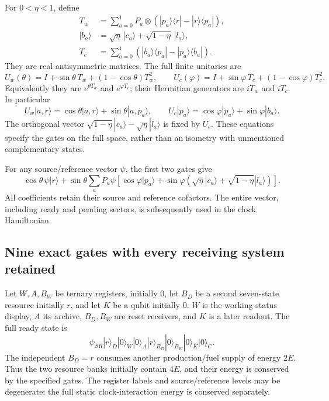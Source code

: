 \documentclass[11pt,oneside,openany]{book}
\theoremstyle{definition}
\theoremstyle{remark}\newtheorem{remark}[theorem]{Remark}
\begin{document}
For $0<\eta<1$, define
\begin{align}\label{p:mat-generators}
 T_w&=\sum_{a=0}^1P_a\otimes
       (|p_a\rangle\langle r|-|r\rangle\langle p_a|),\\
 |b_a\rangle&=\sqrt\eta\,|c_a\rangle+
                   \sqrt{1-\eta}\,|l_a\rangle,\nonumber\\
 T_c&=\sum_{a=0}^1
       (|b_a\rangle\langle p_a|-|p_a\rangle\langle b_a|).
       \nonumber
\end{align}
They are real antisymmetric matrices.  The full finite unitaries are
\begin{equation}\label{p:mat-rotations}
 U_w(\theta)=I+\sin\theta\,T_w+(1-\cos\theta)T_w^2,
 \qquad
 U_c(\varphi)=I+\sin\varphi\,T_c+(1-\cos\varphi)T_c^2.
\end{equation}
Equivalently they are $e^{\theta T_w}$ and $e^{\varphi T_c}$; their
Hermitian generators are $iT_w$ and $iT_c$.  In particular
\[
 U_w|a,r\rangle=\cos\theta|a,r\rangle+
                       \sin\theta|a,p_a\rangle,
 \qquad
 U_c|p_a\rangle=\cos\varphi|p_a\rangle+
                       \sin\varphi|b_a\rangle.
\]
The orthogonal vector
$\sqrt{1-\eta}|c_a\rangle-\sqrt\eta|l_a\rangle$ is fixed by $U_c$.
These equations specify the gates on the full space, rather than an
isometry with unmentioned complementary states.

For any source/reference vector $\psi$, the first two gates give
\begin{equation}\label{p:mat-resourcevector}
 \cos\theta\,\psi|r\rangle+
 \sin\theta\sum_aP_a\psi
 \left[\cos\varphi|p_a\rangle+
 \sin\varphi\left(\sqrt\eta|c_a\rangle+
                       \sqrt{1-\eta}|l_a\rangle\right)\right].
\end{equation}
All coefficients retain their source and reference cofactors.  The
entire vector, including ready and pending sectors, is subsequently
used in the clock Hamiltonian.

\subsection{Nine exact gates with every receiving system retained}

Let $W,A,B_W$ be ternary registers, initially $0$, let $B_D$ be a
second seven-state resource initially $r$, and let $K$ be a qubit
initially $0$.  $W$ is the working status display, $A$ its archive,
$B_D,B_W$ are reset receivers, and $K$ is a later readout.  The full
ready state is
\begin{equation}\label{p:mat-ready}
 \psi_{SR}|r\rangle_D|0\rangle_W|0\rangle_A
 |r\rangle_{B_D}|0\rangle_{B_W}|0\rangle_K|0\rangle_C.
\end{equation}
The independent $B_D=r$ consumes another production/fuel supply of
energy $2E$.  Thus the two resource banks initially contain $4E$,
and their energy is conserved by the specified gates.  The register
labels and source/reference levels may be degenerate; the full
static clock-interaction energy is conserved separately.
\end{document}
